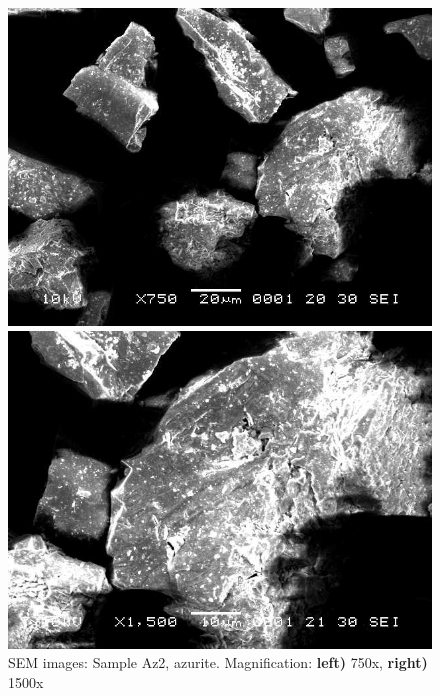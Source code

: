 \begin{figure}[H]
\centering
\begin{minipage}{.45\textwidth}
  \centering
  \includegraphics[width=\linewidth]{Az2_x750_1_150321}
\end{minipage}
\begin{minipage}{.45\textwidth}
  \centering
  \includegraphics[width=\linewidth]{Az2_x1500_1_150321}
\end{minipage}
\caption[SEM images: Sample Az2, azurite]{SEM images: Sample Az2, azurite. Magnification: \textbf{left)} 750x, \textbf{right)} 1500x}
\label{fig:az2_sem_2}
\end{figure}



